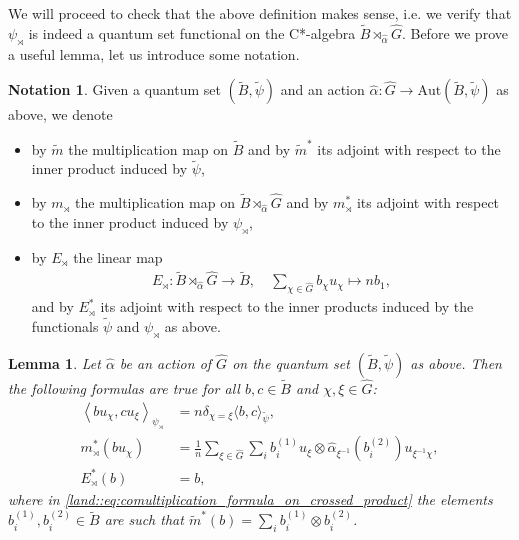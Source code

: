 \documentclass{amsart}
\newtheorem{lemma}[thm]{Lemma}
\theoremstyle{definition}
\newtheorem{notation}[thm]{Notation}
\theoremstyle{definition}
\begin{document}
We will proceed to check that the above definition makes sense, i.e. we verify that $\psi_\rtimes$ is indeed a quantum set functional on the C*-algebra $\tilde{B} \rtimes_{\hat{\alpha}} \hat{G}$. Before we prove a useful lemma, let us introduce some notation.

\begin{notation}
    \label{pre::notation:crossed_product_quantum_sets}
    Given a quantum set $(\tilde{B}, \tilde{\psi})$ and an action $\hat{\alpha}: \hat{G} \to \mathrm{Aut}(\tilde{B}, \tilde{\psi})$ as above, we denote
    \begin{itemize}
        \item by $\tilde{m}$ the multiplication map on $\tilde{B}$ and by $\tilde{m}^\ast$ its adjoint with respect to the inner product induced by $\tilde{\psi}$,
        \item by $m_\rtimes$ the multiplication map on $\tilde{B} \rtimes_{\hat{\alpha}} \hat{G}$ and by $m_\rtimes^\ast$ its adjoint with respect to the inner product induced by $\psi_\rtimes$,
        \item by $E_\rtimes$ the linear map
        \begin{align*}
            E_\rtimes: \tilde{B} \rtimes_{\hat{\alpha}} \hat{G} \to \tilde{B}, \quad \sum_{\chi \in \hat{G}} b_\chi u_\chi \mapsto n b_1,
        \end{align*}
        and by $E_\rtimes^\ast$ its adjoint with respect to the inner products induced by the functionals $\tilde{\psi}$ and $\psi_\rtimes$ as above.
    \end{itemize}
\end{notation}

\begin{lemma}
    \label{land::lemma:description_of_crossed_product}
    Let $\hat{\alpha}$ be an action of $\hat{G}$ on the quantum set $(\tilde{B}, \tilde{\psi})$ as above. Then the following formulas are true for all $b, c \in \tilde{B}$ and $\chi, \xi \in \hat{G}$:
    \begin{align}
        \label{land::eq:formula_for_scalar_product_on_crossed_product_algebra}
        \left\langle b u_\chi, c u_\xi \right\rangle_{\psi_\rtimes} 
        &= n \delta_{\chi=\xi} \langle b, c \rangle_{\tilde{\psi}}, \\
        \label{land::eq:comultiplication_formula_on_crossed_product}
        m_\rtimes^\ast\left(b u_\chi\right) &= \frac{1}{n} \sum_{\xi \in \hat{G}} \sum_i b_i^{(1)} u_\xi \otimes \hat{\alpha}_{\xi^{-1}}(b_i^{(2)}) u_{\xi^{-1} \chi}, \\
        \label{eq:formula_for_E*}
        E_\rtimes^\ast(b) &= b,
    \end{align}
    where in \eqref{land::eq:comultiplication_formula_on_crossed_product} the elements $b_i^{(1)}, b_i^{(2)} \in \tilde{B}$ are such that $\tilde{m}^\ast(b) = \sum_i b_i^{(1)} \otimes b_i^{(2)}$.
\end{lemma}
\end{document}
